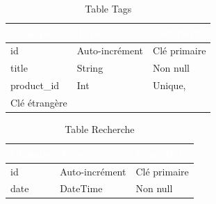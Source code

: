 \begin{table}[H]
\centering
\Large
{} %
\begin{tabular}{|p{4cm}|p{4cm}|p{4cm}|}
\hline
\rowcolor{blue!50} \textcolor{white}{Champs} & \textcolor{white}{Type} & \textcolor{white}{Contrainte} \\
\hline
id & Auto-incrément & Clé primaire \\ \hline
title & String & Non null \\ \hline
product\_id & Int & Unique,\\ Clé étrangère \\ \hline
\end{tabular}
\caption{Table Tags}
\label{tab:table_tags}
\end{table}

\begin{table}[H]
\centering
\Large
{} %
\begin{tabular}{|p{4cm}|p{4cm}|p{4cm}|}
\hline
\rowcolor{blue!50} \textcolor{white}{Champs} & \textcolor{white}{Type} & \textcolor{white}{Contrainte} \\
\hline
id & Auto-incrément & Clé primaire \\ \hline
date & DateTime & Non null \\ \hline
\end{tabular}
\caption{Table Recherche}
\label{tab:table_recherche}
\end{table}

